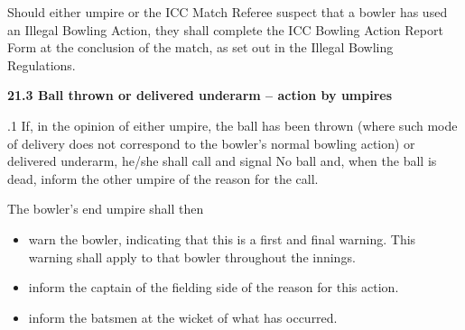\documentclass[12pt]{article}
\begin{document}
\vspace{\baselineskip}
\begin{adjustwidth}{0.0in}{0.15in}
{\fontsize{9pt}{10.8pt}\selectfont Should either umpire or the ICC Match Referee suspect that a bowler has used an Illegal Bowling Action, they shall complete the ICC Bowling Action Report Form at the conclusion of the match, as set out in the Illegal Bowling Regulations.\par}\par

\end{adjustwidth}


\vspace{\baselineskip}
{\fontsize{11pt}{13.2pt}\selectfont \textbf{21.3 \tabto{0.47in} Ball thrown or delivered underarm – action by umpires}\par}\par


\vspace{\baselineskip}
\begin{adjustwidth}{0.5in}{0.0in}
{\fontsize{9pt}{10.8pt}.1 \tabto{0.49in} If, in the opinion of either umpire, the ball has been thrown (where such mode of delivery does not correspond to the bowler’s normal bowling action) or delivered underarm, he/she shall call and signal No ball and, when the ball is dead, inform the other umpire of the reason for the call.\par}\par

\end{adjustwidth}


\vspace{\baselineskip}
\begin{adjustwidth}{0.5in}{0.0in}
{\fontsize{9pt}{10.8pt}\selectfont The bowler’s end umpire shall then\par}\par

\end{adjustwidth}


\vspace{\baselineskip}
\begin{itemize}
	\item {\fontsize{9pt}{10.8pt}\selectfont warn the bowler, indicating that this is a first and final warning. This warning shall apply to that bowler throughout the innings.\par}\par


\vspace{\baselineskip}
	\item {\fontsize{9pt}{10.8pt}\selectfont inform the captain of the fielding side of the reason for this action.\par}\par


\vspace{\baselineskip}
	\item {\fontsize{9pt}{10.8pt}\selectfont inform the batsmen at the wicket of what has occurred.\par}
\end{itemize}\par
\end{document}
